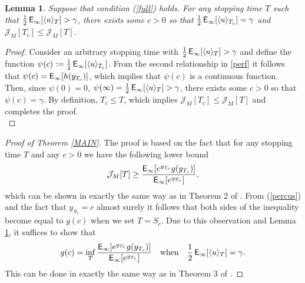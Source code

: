\documentclass[11pt,reqno]{amsart}
\newtheorem{lemma}[theorem]{Lemma}
\theoremstyle{remark}
\begin{document}
 
\begin{lemma} \label{L2}
Suppose that condition (\ref{full}) holds. For any stopping time  $T$ such that  $\frac{1}{2} \,{{\sf E}}_{\infty}[\langle u \rangle_{T}]> \gamma$, there exists some $c>0$ so that  $  \frac{1}{2} \, {{\sf E}}_{\infty}[\langle u \rangle_{T_{c}}]= \gamma$ and ${\mathcal{J}}_{M}[{T_{c}}] \leq {\mathcal{J}}_{M}[T]$.
\end{lemma}

\begin{proof}
Consider an arbitrary stopping time with  $ \frac{1}{2} \, {{\sf E}}_{\infty}[\langle u \rangle_{T}]> \gamma$ and define the function $\psi(c):=  \frac{1}{2} \,{{\sf E}}_{\infty}[\langle u \rangle_{T_{c}}]$. From the second relationship in \eqref{perf} it follows that  $\psi(c) = {{\sf E}}_{\infty}[h(y_{T_{c}})]$, which implies that $\psi(c)$ is a continuous function. Then, since 
$\psi(0)=0$, $\psi(\infty)= \frac{1}{2} \, {{\sf E}}_{\infty}[\langle u \rangle_{T}]>\gamma$, there exists some $c>0$ so that $\psi(c)= \gamma$. By definition, ${T_{c}} \leq {T}$, which implies ${\mathcal{J}}_{M}[{T_{c}}] \leq {\mathcal{J}}_{M}[T]$ and completes the proof. \\
\end{proof}

 

\begin{proof}[Proof of Theorem \ref{MAIN}]
The proof is based on the fact that for any stopping time $T$ and any $c>0$ we have the following lower bound
$${\mathcal{J}}_{M}[{T}] \geq  \frac{{{\sf E}}_{\infty}[e^{y_{T_{c}}} g(y_{T_{c}})]}{{{\sf E}}_{\infty}[e^{y_{T_{c}}}]},$$
which can be shown in exactly the same way as in Theorem 2 of \cite{moustito}. From (\ref{percus}) and the  fact that  $y_{S_{c}}=c$ almost surely  
it follows that both sides of the inequality become equal to $g(c)$ when we set ${T}={S_{c}}$. Due to this observation and Lemma \ref{L2},
it suffices to show that 
$$g(c) = \inf_{T} \frac{{{\sf E}}_{\infty}[e^{y_{T_{c}}} g(y_{T_{c}})]}{{{\sf E}}_{\infty}[e^{y_{T_{c}}}]} \quad \text{when} \quad \frac{1}{2} \, {{\sf E}}_{\infty}[\langle u \rangle_{T}]=\gamma.$$
This can be done in exactly the same way as in Theorem 3 of \cite{moustito}.  
\end{proof}
\end{document}
